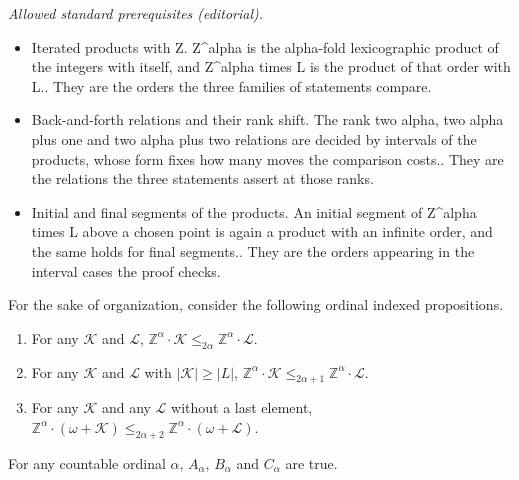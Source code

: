 \documentclass[10pt,a4paper]{amsart}
\providecommand{\tightlist}{%
  \setlength{\itemsep}{0pt}\setlength{\parskip}{0pt}}
\providecommand{\L}{\mathcal{L}}
\newcommand{\Z}{\mathbb{Z}}
\newcommand{\K}{\mathcal{K}}
\renewcommand{\L}{\mathcal{L}}
\begin{document}
\noindent\textit{Allowed standard prerequisites (editorial).}\begin{itemize}
\item Iterated products with Z. Z\textasciicircum{}alpha is the alpha-fold lexicographic product of the integers with itself, and Z\textasciicircum{}alpha times L is the product of that order with L.. They are the orders the three families of statements compare.
\item Back-and-forth relations and their rank shift. The rank two alpha, two alpha plus one and two alpha plus two relations are decided by intervals of the products, whose form fixes how many moves the comparison costs.. They are the relations the three statements assert at those ranks.
\item Initial and final segments of the products. An initial segment of Z\textasciicircum{}alpha times L above a chosen point is again a product with an infinite order, and the same holds for final segments.. They are the orders appearing in the interval cases the proof checks.
\end{itemize}\medskip
\begin{lemma}\label{lem:timesZ}
For the sake of organization, consider the following ordinal indexed propositions.
\begin{enumerate}\tightlist
\item[($A_\alpha$)] For any $\K$ and $\L$, $\Z^\alpha\cdot \K
    \leq_{2\alpha}\Z^\alpha\cdot \L$.
\item[($B_\alpha$)] For any $\K$ and $\L$ with $|\K|\geq|L|$, $\Z^\alpha\cdot \K
    \leq_{2\alpha+1}\Z^\alpha\cdot \L$.
\item[($C_\alpha$)] For any $\K$ and any $\L$ without a last element,
    $\Z^\alpha\cdot(\omega+\K)\leq_{2\alpha+2} \Z^\alpha\cdot(\omega+\L)$.
\end{enumerate}
For any countable ordinal $\alpha$, $A_\alpha$, $B_\alpha$ and $C_\alpha$ are true.
\end{lemma}
\end{document}
